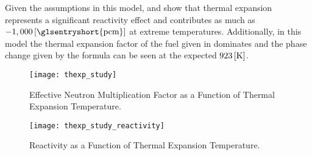   Given the assumptions in this model,   and
   show that thermal expansion represents a
  significant reactivity effect and contributes as much as $-1,000
  \units{\glsentryshort{pcm}}$ at extreme temperatures. Additionally, in this
  model the thermal expansion factor of the fuel given in 
  dominates and the phase change given by the formula can be seen at the
  expected $923 \left[\text{{K}}\right]$.

  \begin{figure}
    \centering
    \texttt{[image: thexp\_study]}
    \caption{Effective Neutron Multiplication Factor as a Function of 
      Thermal Expansion Temperature.}
    \label{fig:thexp_study}
  \end{figure}

  \begin{figure}
    \centering
    \texttt{[image: thexp\_study\_reactivity]}
    \caption{Reactivity as a Function of Thermal Expansion Temperature.}
    \label{fig:thexp_study_reactivity}
  \end{figure}
